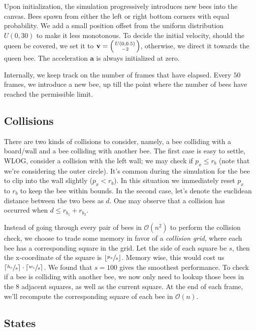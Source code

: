 \documentclass[a4paper,11pt]{article}
\begin{document}
Upon initialization, the simulation progressively introduces new bees into the
canvas. Bees spawn from either the left or right bottom corners with equal
probability. We add a small position offset from the uniform distribution $U(0, 30)$
to make it less monotonous. To decide the initial velocity, should the queen be
covered, we set it to $\mathbf{v} = \begin{psmallmatrix} U(0, 0.5) \\ -2 \end{psmallmatrix}$,
otherwise, we direct it towards the queen bee. The acceleration $\mathbf{a}$ is always
initialized at zero.

Internally, we keep track on the number of frames that have elapsed. Every $50$
frames, we introduce a new bee, up till the point where the number of bees
have reached the permissible limit.

\subsection{Collisions}
There are two kinds of collisions to consider, namely, a bee colliding with a board/wall
and a bee colliding with another bee. The first case is easy to settle, WLOG, consider
a collision with the left wall; we may check if $p_{x} \leq r_{b}$ (note that we're
considering the outer circle). It's common during the simulation for the bee to clip into
the wall slightly ($p_{x} < r_{b}$). In this situation we immediately reset $p_{x}$ to $r_{b}$
to keep the bee within bounds. In the second case, let's denote the euclidean distance
between the two bees as $d$. One may observe that a collision has occurred when
$d \leq r_{b_{1}}+r_{b_{2}}$.

Instead of going through every pair of bees in $\mathcal{O}(n^{2})$ to perform the collision
check, we choose to trade some memory in favor of a \textit{collision grid}, where each
bee has a corresponding square in the grid. Let the side of each square be $s$, then
the x-coordinate of the square is $\lfloor \sfrac{p_{x}}{s} \rfloor$. Memory wise,
this would cost us $\lceil \sfrac{h_{c}}{s} \rceil \cdot \lceil \sfrac{w_{c}}{s} \rceil$.
We found that $s = 100$ gives the smoothest performance. To check if a bee is colliding
with another bee, we now only need to lookup those bees in the $8$ adjacent squares, as
well as the current square. At the end of each frame, we'll recompute the corresponding
square of each bee in $\mathcal{O}(n)$.

\subsection{States}
\end{document}
